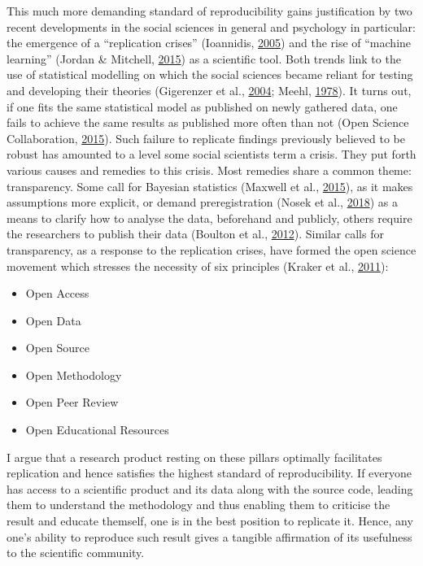 \documentclass[12pt,a4paper,]{article}
\providecommand{\tightlist}{%
  \setlength{\itemsep}{0pt}\setlength{\parskip}{0pt}}
\begin{document}
This much more demanding standard of reproducibility gains justification by two recent developments in the social sciences in general and psychology in particular: the emergence of a ``replication crises'' (Ioannidis, \protect\hyperlink{ref-ioannidisWhyMostPublished2005}{2005}) and the rise of ``machine learning'' (Jordan \& Mitchell, \protect\hyperlink{ref-jordanMachineLearningTrends2015}{2015}) as a scientific tool.
Both trends link to the use of statistical modelling on which the social sciences became reliant for testing and developing their theories (Gigerenzer et al., \protect\hyperlink{ref-gigerenzerNullRitualWhat2004}{2004}; Meehl, \protect\hyperlink{ref-meehlTheoreticalRisksTabular1978}{1978}).
It turns out, if one fits the same statistical model as published on newly gathered data, one fails to achieve the same results as published more often than not (Open Science Collaboration, \protect\hyperlink{ref-opensciencecollaborationEstimatingReproducibilityPsychological2015}{2015}).
Such failure to replicate findings previously believed to be robust has amounted to a level some social scientists term a crisis.
They put forth various causes and remedies to this crisis.
Most remedies share a common theme: transparency.
Some call for Bayesian statistics (Maxwell et al., \protect\hyperlink{ref-maxwellPsychologySufferingReplication2015}{2015}), as it makes assumptions more explicit, or demand preregistration (Nosek et al., \protect\hyperlink{ref-nosekPreregistrationRevolution2018}{2018}) as a means to clarify how to analyse the data, beforehand and publicly, others require the researchers to publish their data (Boulton et al., \protect\hyperlink{ref-boultonScienceOpenEnterprise2012}{2012}).
Similar calls for transparency, as a response to the replication crises, have formed the open science movement which stresses the necessity of six principles (Kraker et al., \protect\hyperlink{ref-krakerCaseOpenScience2011}{2011}):

\begin{itemize}
\tightlist
\item
  Open Access
\item
  Open Data
\item
  Open Source
\item
  Open Methodology
\item
  Open Peer Review
\item
  Open Educational Resources
\end{itemize}

I argue that a research product resting on these pillars optimally facilitates replication and hence satisfies the highest standard of reproducibility.
If everyone has access to a scientific product and its data along with the source code, leading them to understand the methodology and thus enabling them to criticise the result and educate themself, one is in the best position to replicate it.
Hence, any one's ability to reproduce such result gives a tangible affirmation of its usefulness to the scientific community.
\end{document}
